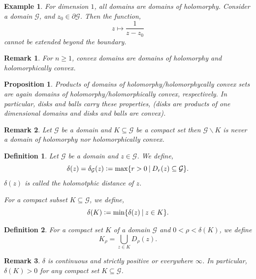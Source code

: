 \documentclass{article}
\newtheorem{proposition}{Proposition}[section]
\newtheorem{definition}{Definition}[section]
\newtheorem{remark}{Remark}[section]
\newtheorem{example}{Example}[section]
\newcommand{\defeq}{\vcentcolon=}
\newcommand{\G}[0]{\mathcal{G}}
\newcommand{\sep}[0]{\:|\:}
\newcommand{\bd}[0]{\partial}
\begin{document}
\begin{example}
  For dimension $1$, all domains are domains of holomorphy. Consider a domain $\G$, and $z_0\in\bd\G$. Then the function,
  \begin{equation*}
    z\mapsto{\frac 1 {z-z_0}}
  \end{equation*}
  cannot be extended beyond the boundary.
\end{example}

\begin{remark}
  For $n\geq 1$, convex domains are domains of holomorphy and holomorphically convex.
\end{remark}

\begin{proposition}
  Products of domains of holomorphy/holomorphycally convex sets are again domains of holomorphy/holomorphically convex, respectively.
  In particular, disks and balls carry these properties, (disks are products of one dimensional domains and disks and balls are convex).
\end{proposition}

\begin{remark}
  Let $\G$ be a domain and $K\subseteq \G$ be a compact set then $\G\backslash K$ is never a domain of holomorphy nor holomorphically convex.
\end{remark}

\begin{definition}
  Let $\G$ be a domain and $z\in\G$. We define,
  \begin{equation*}
    \delta(z) = \delta_\G(z) \defeq\max\{r>0\sep D_r(z)\subseteq\G\}.
  \end{equation*}
  $\delta(z)$ is called the holomotphic distance of $z$. 
  \par For a compact subset $K\subseteq\G$, we define,
  \begin{equation*}
    \delta(K)\defeq\min\{\delta(z)\sep z\in K\}.
  \end{equation*}
\end{definition}

\begin{definition}
  For a compact set $K$ of a domain $\G$ and $0<\rho<\delta(K)$, we define
  \begin{equation*}
    K_\rho = \bigcup_{z\in K}D_\rho(z).
  \end{equation*}
\end{definition}

\begin{remark}
  $\delta$ is continuous and strictly positive or everywhere $\infty$. In particular, $\delta(K)>0$ for any compact set $K\subseteq\G$.
\end{remark}
\end{document}
